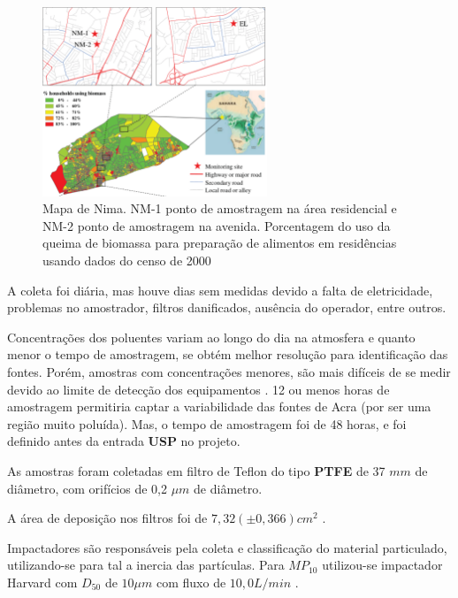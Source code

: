 \begin{figure}[H]
\begin{center}
  \includegraphics[width=0.6\textwidth]{../inputs/images/zheng/nima_mapa.pdf}
  \caption{Mapa de Nima. NM-1 ponto de amostragem na área residencial e 
           NM-2 ponto de amostragem na avenida. Porcentagem do uso da queima
           de biomassa para preparação de alimentos em residências usando dados
           do censo de 2000 \citep{ghanacensus2003} \label{fig:nima_mapa}}
\end{center}
\end{figure}

A coleta foi diária, mas houve dias sem medidas devido a falta de eletricidade,
problemas no amostrador, filtros danificados, ausência do operador, entre outros. 

Concentrações dos poluentes variam ao longo do dia na atmosfera
e quanto menor o tempo de amostragem, se obtém melhor resolução 
para identificação das fontes. Porém, amostras com concentrações menores, 
são mais difíceis de se medir devido ao limite de detecção dos equipamentos
\citep{calzolai2015}. 12 ou menos horas de amostragem permitiria captar 
a variabilidade das fontes de Acra (por ser uma região muito poluída).
Mas, o tempo de amostragem foi de 48 horas, e foi definido antes da 
entrada \textbf{USP} no projeto.

As amostras  foram coletadas em filtro de Teflon do tipo 
\textbf{PTFE} de 37 $mm$ de diâmetro, com orifícios de 0,2 $\mu m$ de diâmetro. 

A área de deposição nos filtros foi de $7,32 (\pm 0,366) cm^2$ .

Impactadores são responsáveis pela coleta e classificação 
do material particulado, utilizando-se para tal a inercia das
partículas.
Para $MP_{10}$ utilizou-se impactador Harvard com $D_{50}$ de $10 \mu m$ 
com fluxo de $10,0 L/min$ \citep{marple1987}. 

